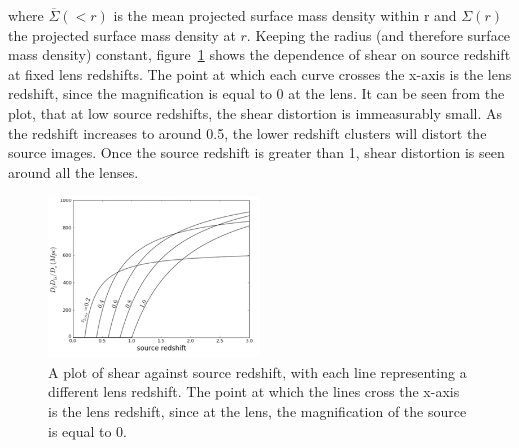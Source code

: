 	where $\overline{\Sigma}(<r)$ is the mean projected surface mass density within r and $\Sigma(r)$ the projected surface mass density at $r$. Keeping the radius (and therefore surface mass density) constant, figure~\ref{fig:shear_as_a_function_of_source_redshift} shows the dependence of shear on source redshift at fixed lens redshifts. The point at which each curve crosses the x-axis is the lens redshift, since the magnification is equal to 0 at the lens. It can be seen from the plot, that at low source redshifts, the shear distortion is immeasurably small. As the redshift increases to around 0.5, the lower redshift clusters will distort the source images. Once the source redshift is greater than 1, shear distortion is seen around all the lenses\cite{Constraining_source_redshift_distributions}.
	\begin{figure}[ht]
		\centering
			\includegraphics[width=0.5\textwidth]{../Images/Shear_as_a_function_of_source_redshift.png}
		\caption[Shear as a function of source redshift]{\cite{Constraining_source_redshift_distributions}A plot of shear against source redshift, with each line representing a different lens redshift. The point at which the lines cross the x-axis is the lens redshift, since at the lens, the magnification of the source is equal to 0.\label{fig:shear_as_a_function_of_source_redshift}}
	\end{figure}

